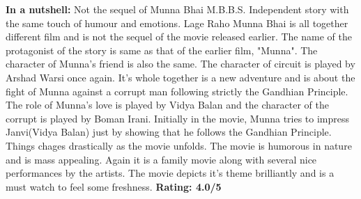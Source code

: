 \documentclass{article}
\begin{document}
\newline
\textbf{In a nutshell: }Not the sequel of Munna Bhai M.B.B.S. Independent story with the same touch of humour and emotions.
\newline
Lage Raho Munna Bhai is all together different film and is not the sequel of the movie released earlier. The name of the protagonist of the story is same as that of the earlier film, "Munna". The character of Munna's friend is also the same. The character of circuit is played by Arshad Warsi once again. It's whole together is a new adventure and is about the fight of Munna against a corrupt man following strictly the Gandhian Principle. The role of Munna's love is played by Vidya Balan and the character of the corrupt is played by Boman Irani. Initially in the movie, Munna tries to impress Janvi(Vidya Balan) just by showing that he follows the Gandhian Principle. Things chages drastically as the movie unfolds. 
\newline
The movie is humorous in nature and is mass appealing. Again it is a family movie along with several nice performances by the artists. The movie depicts it's theme brilliantly and is a must watch to feel some freshness. \newline
\newline
\textbf{Rating: 4.0/5}
\newline
\end{document}
